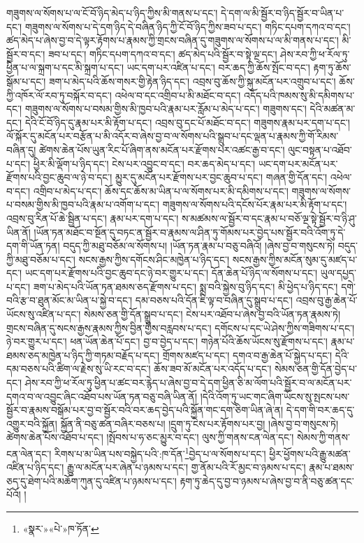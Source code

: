 གཟུགས་ལ་སོགས་པ་ལ་ངོ་བོ་ཉིད་མེད་པ་ཉིད་ཀྱིས་མི་གནས་པ་དང་། དེ་དག་ལ་མི་སྦྱོར་བ་ཉིད་སྦྱོར་བ་ཡིན་པ་དང་། གཟུགས་ལ་སོགས་པ་དེ་དག་ཉིད་དེ་བཞིན་ཉིད་ཀྱི་ངོ་བོ་ཉིད་ཀྱིས་ཟབ་པ་དང་། གཏིང་དཔག་དཀའ་བ་དང་། ཚད་མེད་པ་ཞེས་བྱ་བ་དེ་ལྟར་རྟོགས་པ་རྣམས་ཀྱི་གྲངས་བཞིན་དུ་གཟུགས་ལ་སོགས་པ་ལ་མི་གནས་པ་དང་། མི་སྦྱོར་བ་དང་། ཟབ་པ་དང་། གཏིང་དཔག་དཀའ་བ་དང་། ཚད་མེད་པའི་སྦྱོར་བ་སྟེ་ལྔ་དང་། ཤེས་རབ་ཀྱི་ཕ་རོལ་ཏུ་ཕྱིན་པ་ལ་སྐྲག་པ་དང་མི་སྐྲག་པ་དང་། ཡང་དག་པར་འཛིན་པ་དང་། བར་ཆད་ཀྱི་ཆོས་སྤོང་བ་དང་། རྟག་ཏུ་ཆོས་སྒོམ་པ་དང་། ཟག་པ་མེད་པའི་ཆོས་གསར་གྱི་རྟེན་ཉིད་དང་། འབྲས་བུ་ཆོས་ཀྱི་སྐུ་མངོན་པར་འགྲུབ་པ་དང་། ཆོས་ཀྱི་འཁོར་ལོ་རབ་ཏུ་བསྐོར་བ་དང་། འཕེལ་བ་དང་འགྲིབ་པ་མི་མཐོང་བ་དང་། འདོད་པའི་ཁམས་སུ་མི་དམིགས་པ་དང་། གཟུགས་ལ་སོགས་པ་བསམ་གྱིས་མི་ཁྱབ་པའི་རྣམ་པར་རློམ་པ་མེད་པ་དང་། གཟུགས་དང་། དེའི་མཚན་མ་དང་། དེའི་ངོ་བོ་ཉིད་དུ་རྣམ་པར་མི་རྟོག་པ་དང་། འབྲས་བུ་དང་པོ་མཐོང་བ་དང་། གཟུགས་རྣམ་པར་དག་པ་དང་། ལོ་སྐོར་དུ་མངོན་པར་བརྩོན་པ་མི་འདོར་བ་ཞེས་བྱ་བ་ལ་སོགས་པའི་སྒྲུབ་པ་དང་ལྡན་པ་རྣམས་ཀྱི་གོ་རིམས་བཞིན་དུ། ཚེགས་ཆེན་པོས་ཡུན་རིང་པོ་ཞིག་ནས་མངོན་པར་རྫོགས་པར་འཚང་རྒྱ་བ་དང་། ལུང་བསྟན་པ་འཐོབ་པ་དང་། ཕྱིར་མི་ལྡོག་པ་ཉིད་དང་། ངེས་པར་འབྱུང་བ་དང་། བར་ཆད་མེད་པ་དང་། ཡང་དག་པར་མངོན་པར་རྫོགས་པའི་བྱང་ཆུབ་ལ་ཉེ་བ་དང་། མྱུར་དུ་མངོན་པར་རྫོགས་པར་བྱང་ཆུབ་པ་དང་། གཞན་གྱི་དོན་དང་། འཕེལ་བ་དང་། འགྲིབ་པ་མེད་པ་དང་། ཆོས་དང་ཆོས་མ་ཡིན་པ་ལ་སོགས་པར་མི་དམིགས་པ་དང་། གཟུགས་ལ་སོགས་པ་བསམ་གྱིས་མི་ཁྱབ་པའི་རྣམ་པ་འགོག་པ་དང་། གཟུགས་ལ་སོགས་པའི་དངོས་པོར་རྣམ་པར་མི་རྟོག་པ་དང་། འབྲས་བུ་རིན་པོ་ཆེ་སྦྱིན་པ་དང་། རྣམ་པར་དག་པ་དང་། ས་མཚམས་ལ་སྦྱོར་བ་དང་རྣམ་པ་བཅོ་ལྔ་སྟེ་སྦྱོར་བ་ཉི་ཤུ་ཡིན་ནོ། །ཡོན་ཏན་མཐོང་བ་སྔོན་དུ་བཏང་ན་སྦྱོར་བ་རྣམས་ལ་ཤིན་ཏུ་གོམས་པར་བྱེད་པས་སྦྱོར་བའི་འོག་ཏུ་དེ་དག་གི་ཡོན་ཏན། བདུད་ཀྱི་མཐུ་བཅོམ་ལ་སོགས་པ། །ཡོན་ཏན་རྣམ་པ་བཅུ་བཞིའོ། །ཞེས་བྱ་བ་གསུངས་ཏེ། བདུད་ཀྱི་མཐུ་བཅོམ་པ་དང་། སངས་རྒྱས་ཀྱིས་དགོངས་ཤིང་མཁྱེན་པ་ཉིད་དང་། སངས་རྒྱས་ཀྱིས་མངོན་སུམ་དུ་མཛད་པ་དང་། ཡང་དག་པར་རྫོགས་པའི་བྱང་ཆུབ་དང་ཉེ་བར་གྱུར་པ་དང་། དོན་ཆེན་པོ་ཉིད་ལ་སོགས་པ་དང་། ཡུལ་དཔྱད་པ་དང་། ཟག་པ་མེད་པའི་ཡོན་ཏན་ཐམས་ཅད་རྫོགས་པ་དང་། སྨྲ་བའི་སྐྱེས་བུ་ཉིད་དང་། མི་ཕྱེད་པ་ཉིད་དང་། དགེ་བའི་རྩ་བ་ཐུན་མོང་མ་ཡིན་པ་སྐྱེ་བ་དང་། དམ་བཅས་པའི་དོན་ཇི་ལྟ་བ་བཞིན་དུ་སྒྲུབ་པ་དང་། འབྲས་བུ་རྒྱ་ཆེན་པོ་ཡོངས་སུ་འཛིན་པ་དང་། སེམས་ཅན་གྱི་དོན་སྒྲུབ་པ་དང་། ངེས་པར་འཐོབ་པ་ཞེས་བྱ་བའི་ཡོན་ཏན་རྣམས་ཏེ། གྲངས་བཞིན་དུ་སངས་རྒྱས་རྣམས་ཀྱིས་བྱིན་གྱིས་བརླབས་པ་དང་། དགོངས་པ་དང་ཡེ་ཤེས་ཀྱིས་གཟིགས་པ་དང་། ཉེ་བར་གྱུར་པ་དང་། ཕན་ཡོན་ཆེན་པོ་དང་། བྱ་བ་བྱེད་པ་དང་། གཉེན་པོའི་ཆོས་ཡོངས་སུ་རྫོགས་པ་དང་། རྣམ་པ་ཐམས་ཅད་མཁྱེན་པ་ཉིད་ཀྱི་གཏམ་བརྗོད་པ་དང་། གྲོགས་མཛད་པ་དང་། དགའ་བ་རྒྱ་ཆེན་པོ་སྐྱེད་པ་དང་། དེའི་དམ་བཅས་པའི་ཚིག་ལ་རྗེས་སུ་ཡི་རང་བ་དང་། ཆོས་ཟབ་མོ་མངོན་པར་འདོད་པ་དང་། སེམས་ཅན་གྱི་དོན་བྱེད་པ་དང་། ཤེས་རབ་ཀྱི་ཕ་རོལ་ཏུ་ཕྱིན་པ་ཚང་བར་རྙེད་པ་ཞེས་བྱ་བ་དེ་དག་ཕྱིན་ཅི་མ་ལོག་པའི་སྦྱོར་བ་ལ་མངོན་པར་དགའ་བ་ལ་འབྱུང་ཞིང་འཐོབ་པས་ཡོན་ཏན་བཅུ་བཞི་ཡིན་ནོ། །དེའི་འོག་ཏུ་ཡང་གང་ཞིག་ཡོངས་སུ་སྤངས་པས་སྦྱོར་བ་རྣམས་བསྒོམ་པར་བྱ་བ་སྦྱོར་བའི་བར་ཆད་བྱེད་པའི་སྐྱོན་གང་དག་ཅིག་ཡིན་ཞེ་ན། དེ་དག་གི་བར་ཆད་དུ་འགྱུར་བའི་སྐྱོན། སྐྱོན་ནི་བཅུ་ཚན་བཞིར་བཅས་པ། །དྲུག་ཏུ་ངེས་པར་རྟོགས་པར་བྱ། །ཞེས་བྱ་བ་གསུངས་ཏེ། ཚེགས་ཆེན་པོས་འཐོབ་པ་དང་། །སྤོབས་པ་ཧ་ཅང་མྱུར་བ་དང་། ལུས་ཀྱི་གནས་ངན་ལེན་དང་། སེམས་ཀྱི་གནས་ངན་ལེན་དང་། རིགས་པ་མ་ཡིན་པས་བསྐྱེད་པའི་:ཁ་དོན་\footnote{«སྣར་»«པེ་»ཁ་ཏོན་}བྱེད་པ་ལ་སོགས་པ་དང་། ཕྱིར་ཕྱོགས་པའི་རྒྱུ་མཚན་འཛིན་པ་ཉིད་དང་། རྒྱུ་ལ་མངོན་པར་ཞེན་པ་ཉམས་པ་དང་། གྱ་ནོམ་པའི་རོ་མྱང་བ་ཉམས་པ་དང་། རྣམ་པ་ཐམས་ཅད་དུ་ཐེག་པའི་མཆོག་ཀུན་དུ་འཛིན་པ་ཉམས་པ་དང་། རྟག་ཏུ་ཆེད་དུ་བྱ་བ་ཉམས་པ་ཞེས་བྱ་བ་ནི་བཅུ་ཚན་དང་པོའོ། །
